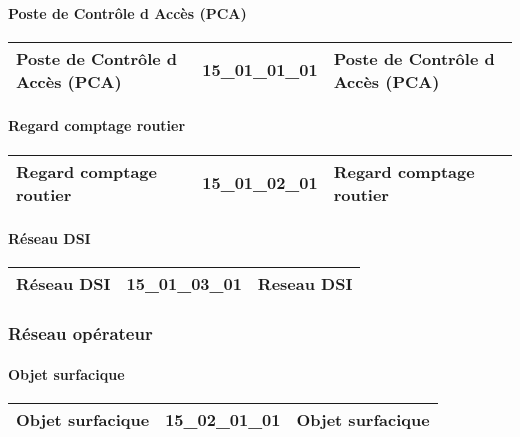 \documentclass[12pt,titlepage,oneside]{book}
\begin{document}
\paragraph{Poste de Contrôle d Accès (PCA)}
\noindent
\vspace{\baselineskip}

\renewcommand{\arraystretch}{1.2}
\begin{supertabular}{|p{10cm}|c|p{15cm}|}
 Poste de Contrôle d Accès (PCA) & 15\_01\_01\_01 & Poste de Contrôle d Accès (PCA)\\
\hline
\end{supertabular}


\paragraph{Regard comptage routier}
\noindent
\vspace{\baselineskip}

\renewcommand{\arraystretch}{1.2}
\begin{supertabular}{|p{10cm}|c|p{15cm}|}
 Regard comptage routier & 15\_01\_02\_01 & Regard comptage routier\\
\hline
\end{supertabular}


\paragraph{Réseau DSI}
\noindent
\vspace{\baselineskip}

\renewcommand{\arraystretch}{1.2}
\begin{supertabular}{|p{10cm}|c|p{15cm}|}
 Réseau DSI & 15\_01\_03\_01 & Reseau DSI\\
\hline
\end{supertabular}

\subsubsection{\large Réseau opérateur}
\paragraph{Objet surfacique}
\noindent
\vspace{\baselineskip}

\renewcommand{\arraystretch}{1.2}
\begin{supertabular}{|p{10cm}|c|p{15cm}|}
 Objet surfacique & 15\_02\_01\_01 & Objet surfacique\\
\hline
\end{supertabular}
\end{document}
